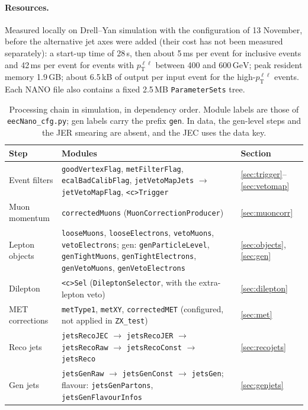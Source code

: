 \documentclass[11pt]{article}
\newcommand{\pt}{p_{\mathrm{T}}}
\newcommand{\GeV}{\ensuremath{\,\mathrm{GeV}}}
\newcommand{\ptll}{\pt^{\ell\ell}}
\newcommand{\code}[1]{\texttt{#1}}
\begin{document}
\paragraph{Resources.} Measured locally on Drell--Yan simulation with the configuration of 13 November, before the
alternative jet axes were added (their cost has not been measured separately): a start-up time
of 28\,s, then about 5\,ms per event for inclusive events and 42\,ms per event for events with $\ptll$ between 400 and
600\GeV; peak resident memory 1.9\,GB; about 6.5\,kB of output per input event for the high-$\ptll$ events. Each NANO file
also contains a fixed 2.5\,MB \code{ParameterSets} tree.

\begin{table}[htbp]
\centering
\caption{Processing chain in simulation, in dependency order. Module labels are those of \code{eecNano\_cfg.py}; gen
labels carry the prefix \code{gen}. In data, the gen-level steps and the JER smearing are absent, and the JEC uses the
data key.}
\label{tab:chain}
\small
\begin{tabularx}{\textwidth}{l>{\raggedright\arraybackslash}X>{\raggedright\arraybackslash}X}
\toprule
Step & Modules & Section \\
\midrule
Event filters & \code{goodVertexFlag}, \code{metFilterFlag}, \code{ecalBadCalibFlag}, \code{jetVetoMapJets} $\to$ \code{jetVetoMapFlag}, \code{<c>Trigger} & \ref{sec:trigger}--\ref{sec:vetomap} \\
Muon momentum & \code{correctedMuons} (\code{MuonCorrectionProducer}) & \ref{sec:muoncorr} \\
Lepton objects & \code{looseMuons}, \code{looseElectrons}, \code{vetoMuons}, \code{vetoElectrons}; gen:
  \code{genParticleLevel}, \code{genTightMuons}, \code{genTightElectrons}, \code{genVetoMuons},
  \code{genVetoElectrons} & \ref{sec:objects}, \ref{sec:gen} \\
Dilepton & \code{<c>Sel} (\code{DileptonSelector}, with the extra-lepton veto) & \ref{sec:dilepton} \\
MET corrections & \code{metType1}, \code{metXY}, \code{correctedMET} (configured, not applied in \code{ZX\_test}) & \ref{sec:met} \\
Reco jets & \code{jetsRecoJEC} $\to$ \code{jetsRecoJER} $\to$ \code{jetsRecoRaw} $\to$ \code{jetsRecoConst} $\to$
  \code{jetsReco} & \ref{sec:recojets} \\
Gen jets & \code{jetsGenRaw} $\to$ \code{jetsGenConst} $\to$ \code{jetsGen}; flavour: \code{jetsGenPartons},
  \code{jetsGenFlavourInfos} & \ref{sec:genjets} \\

\end{tabularx}
\end{table}
\end{document}
